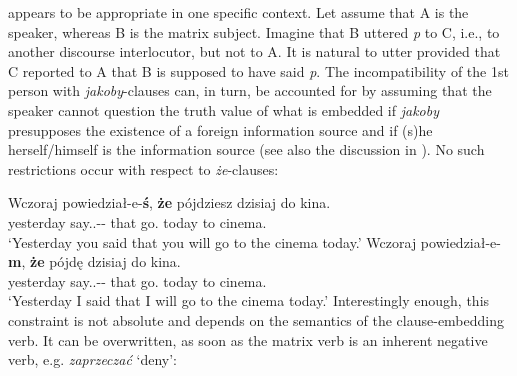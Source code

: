 \documentclass[output=paper]{langsci/langscibook}
\begin{document}
{
\ea {}
\z\z}
 appears to be appropriate in one specific context. Let assume that A is the speaker, whereas B is the matrix subject. Imagine that B uttered \emph{p} to C, i.e., to another discourse interlocutor, but not to A. It is natural to utter  provided that C reported to A that B is supposed to have said \emph{p}. The incompatibility of the 1st person with \emph{jakoby}-clauses can, in turn, be accounted for by assuming that the speaker cannot question the truth value of what is embedded if \emph{jakoby} presupposes the existence of a foreign information source and if (s)he herself\slash himself is the information source (see also the discussion in \citealt{Curnow2002}). No such restrictions occur with respect to \emph{że}-clauses:

 \ea \ea \gll Wczoraj powiedział-e-\textbf{ś}, \textbf{że} pójdziesz dzisiaj do kina. \\
  			yesterday say.{\lptcp}.{\sg}-{\masc}-{\secondperson}{\sg} that go.{\secondperson}{\sg} today to cinema.{\gen} \\
	\glt		`Yesterday you said that you will go to the cinema today.'
	\ex \gll Wczoraj powiedział-e-\textbf{m}, \textbf{że} pójdę dzisiaj do kina. \\
  			yesterday say.{\lptcp}.{\sg}-{\masc}-{\firstperson}{\sg} that go.{\firstperson}{\sg} today to cinema.{\gen} \\
    \glt `Yesterday I said that I will go to the cinema today.'
\z
\z
Interestingly enough, this constraint is not absolute and depends on the semantics of the clause-embedding verb. It can be overwritten, as soon as the matrix verb is an inherent negative verb, e.g. \emph{zaprzeczać} `deny':
\end{document}
